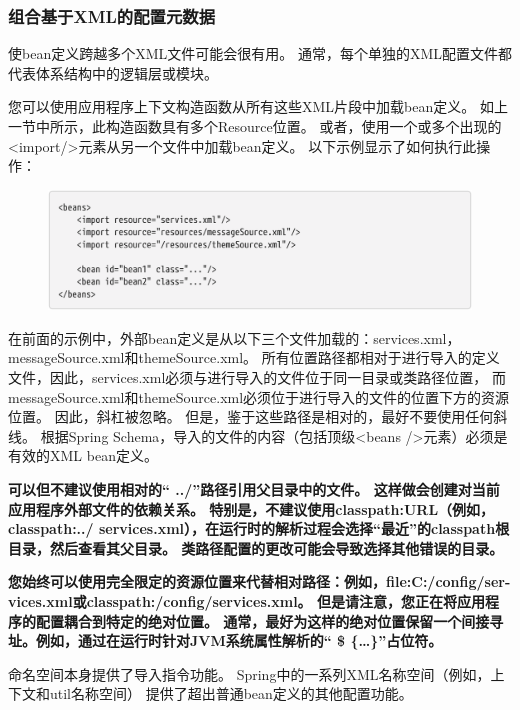  \subsubsection{组合基于XML的配置元数据}
 使bean定义跨越多个XML文件可能会很有用。 
 通常，每个单独的XML配置文件都代表体系结构中的逻辑层或模块。

 您可以使用应用程序上下文构造函数从所有这些XML片段中加载bean定义。 
 如上一节中所示，此构造函数具有多个Resource位置。
  或者，使用一个或多个出现的<import/>元素从另一个文件中加载bean定义。 
  以下示例显示了如何执行此操作：

  \begin{figure}[ht]
    \centering
    \includegraphics[width=1\linewidth]{./Figure/IMG_code_5.png}
    \end{figure}

    在前面的示例中，外部bean定义是从以下三个文件加载的：services.xml，messageSource.xml和themeSource.xml。 
    所有位置路径都相对于进行导入的定义文件，因此，services.xml必须与进行导入的文件位于同一目录或类路径位置，
    而messageSource.xml和themeSource.xml必须位于进行导入的文件的位置下方的资源位置。 
    因此，斜杠被忽略。 但是，鉴于这些路径是相对的，最好不要使用任何斜线。 
    根据Spring Schema，导入的文件的内容（包括顶级<beans />元素）必须是有效的XML bean定义。

\textbf{可以但不建议使用相对的“ ../”路径引用父目录中的文件。 这样做会创建对当前应用程序外部文件的依赖关系。 特别是，不建议使用classpath:URL（例如，classpath:../ services.xml），在运行时的解析过程会选择“最近”的classpath根目录，然后查看其父目录。 类路径配置的更改可能会导致选择其他错误的目录。}

\textbf{您始终可以使用完全限定的资源位置来代替相对路径：例如，file:C:/config/ser-vices.xml或classpath:/config/services.xml。 但是请注意，您正在将应用程序的配置耦合到特定的绝对位置。 通常，最好为这样的绝对位置保留一个间接寻址。例如，通过在运行时针对JVM系统属性解析的“ \$ \{…\}”占位符。}

    命名空间本身提供了导入指令功能。 
    Spring中的一系列XML名称空间（例如，上下文和util名称空间）
    提供了超出普通bean定义的其他配置功能。


